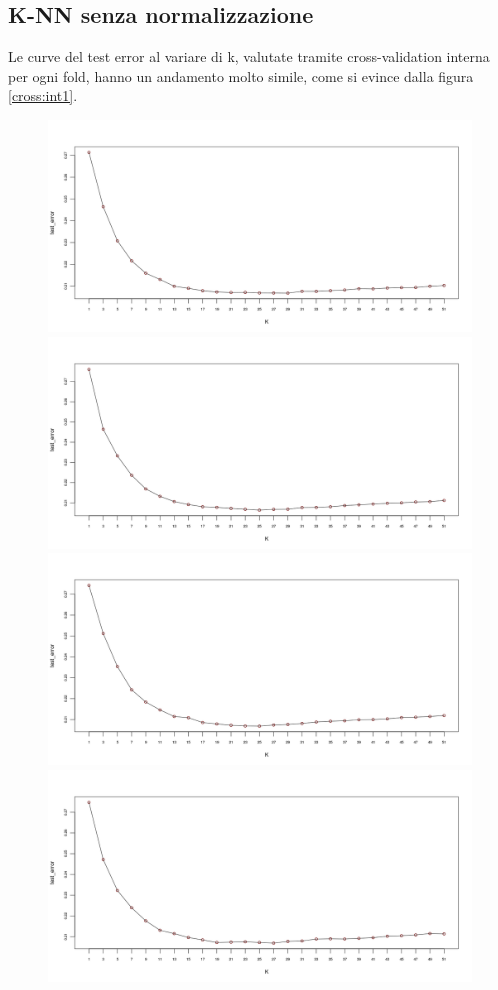 \documentclass[fleqn,10pt]{SelfArx} %
\begin{document}
\subsection{K-NN senza normalizzazione}
Le curve del test error al variare di k, valutate tramite cross-validation interna per ogni fold, hanno un andamento molto simile, come si evince dalla figura \ref{cross:int1}.
\begin{figure}
\includegraphics[scale=0.27]{knn_wo_norm/fold_1.png}
\includegraphics[scale=0.27]{knn_wo_norm/fold_2.png}
\includegraphics[scale=0.27]{knn_wo_norm/fold_3.png}
\includegraphics[scale=0.27]{knn_wo_norm/fold_4.png}

\end{figure}
\end{document}

